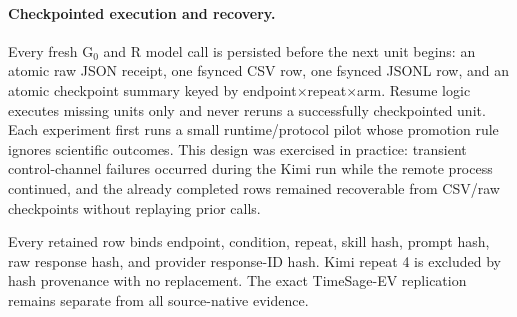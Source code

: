 \paragraph{Checkpointed execution and recovery.}
Every fresh G$_0$ and R model call is persisted before the next unit begins: an atomic raw JSON receipt, one fsynced CSV row, one fsynced JSONL row, and an atomic checkpoint summary keyed by endpoint$\times$repeat$\times$arm. Resume logic executes missing units only and never reruns a successfully checkpointed unit. Each experiment first runs a small runtime/protocol pilot whose promotion rule ignores scientific outcomes. This design was exercised in practice: transient control-channel failures occurred during the Kimi run while the remote process continued, and the already completed rows remained recoverable from CSV/raw checkpoints without replaying prior calls.

Every retained row binds endpoint, condition, repeat, skill hash, prompt hash, raw response hash, and provider response-ID hash. Kimi repeat 4 is excluded by hash provenance with no replacement. The exact TimeSage-EV replication remains separate from all source-native evidence.
